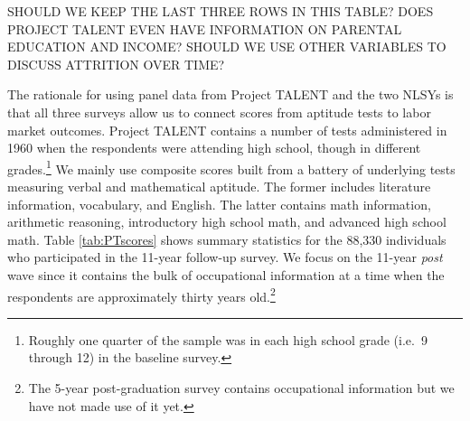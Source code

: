 \documentclass[onehalfspacing,11pt]{article}
\begin{document}
SHOULD WE KEEP THE LAST THREE ROWS IN THIS TABLE? DOES PROJECT TALENT EVEN HAVE INFORMATION ON PARENTAL EDUCATION AND INCOME? SHOULD WE USE OTHER VARIABLES TO DISCUSS ATTRITION OVER TIME?

The rationale for using panel data from Project TALENT and the two NLSYs is that all three surveys allow us to connect scores from aptitude tests to labor market outcomes. 
Project TALENT contains a number of tests administered in 1960 when the respondents were attending high school, though in different grades.\footnote{Roughly one quarter of the sample was in each high school grade (i.e.~9 through 12) in the baseline survey.} We mainly use composite scores built from a battery of underlying tests measuring verbal and mathematical aptitude. The former includes literature information, vocabulary, and English. The latter contains math information, arithmetic reasoning, introductory high school math, and advanced high school math. Table \ref{tab:PTscores} shows summary statistics for the 88,330 individuals who participated in the 11-year follow-up survey. We focus on the 11-year {\it post} wave since it contains the bulk of occupational information at a time when the respondents are approximately thirty years old.\footnote{The 5-year post-graduation survey contains occupational information but we have not made use of it yet.}
	
\end{document}
